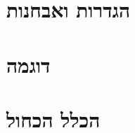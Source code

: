 \documentclass[]{article}
\def\insert#1{}
\begin{document}
\def\lecnum{4}
\def\topcis{
עץ פורש מינימלי
}

\section*{הגדרות ואבחנות}
\insert{preliminary}
\section*{דוגמה}
\insert{example}
\section*{הכלל הכחול}
\insert{blue}
\end{document}
